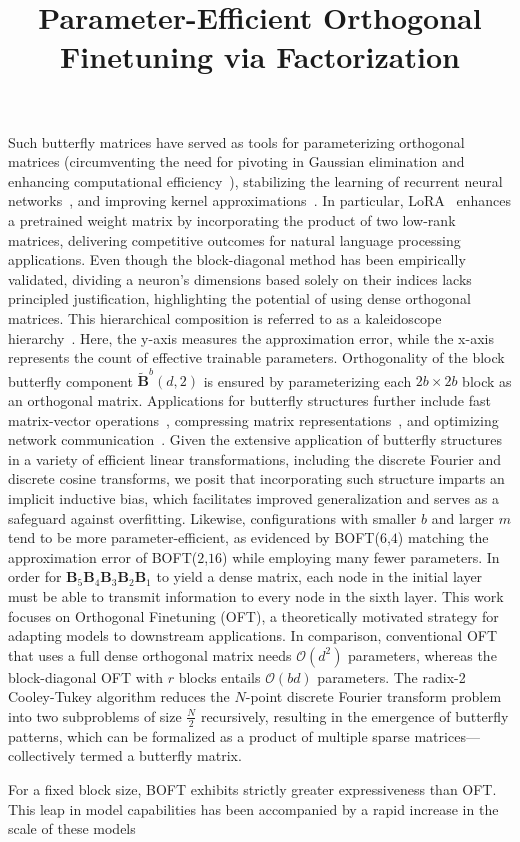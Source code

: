 \title{Parameter-Efficient Orthogonal Finetuning via Factorization}
Such butterfly matrices have served as tools for parameterizing orthogonal matrices (circumventing the need for pivoting in Gaussian elimination and enhancing computational efficiency~\cite{parker1995random}), stabilizing the learning of recurrent neural networks~\cite{jing2017tunable}, and improving kernel approximations~\cite{munkhoeva2018quadrature}. In particular, LoRA~\cite{hulora2022} enhances a pretrained weight matrix by incorporating the product of two low-rank matrices, delivering competitive outcomes for natural language processing applications. Even though the block-diagonal method has been empirically validated, dividing a neuron’s dimensions based solely on their indices lacks principled justification, highlighting the potential of using dense orthogonal matrices. This hierarchical composition is referred to as a kaleidoscope hierarchy~\cite{dao2019kaleidoscope}. Here, the y-axis measures the approximation error, while the x-axis represents the count of effective trainable parameters. Orthogonality of the block butterfly component $\tilde{\bm{B}}^b(d,2)$ is ensured by parameterizing each $2b\times 2b$ block as an orthogonal matrix. Applications for butterfly structures further include fast matrix-vector operations~\cite{michielssen1996multilevel,o2010algorithm}, compressing matrix representations~\cite{li2015butterfly}, and optimizing network communication~\cite{klasing1994broadcasting,li2003linear,rajasingh2016transmission}. Given the extensive application of butterfly structures in a variety of efficient linear transformations, including the discrete Fourier and discrete cosine transforms, we posit that incorporating such structure imparts an implicit inductive bias, which facilitates improved generalization and serves as a safeguard against overfitting. Likewise, configurations with smaller $b$ and larger $m$ tend to be more parameter-efficient, as evidenced by BOFT($6$,$4$) matching the approximation error of BOFT($2$,$16$) while employing many fewer parameters. In order for $\bm{B}_5\bm{B}_4\bm{B}_3\bm{B}_2\bm{B}_1$ to yield a dense matrix, each node in the initial layer must be able to transmit information to every node in the sixth layer. This work focuses on Orthogonal Finetuning (OFT), a theoretically motivated strategy for adapting models to downstream applications. In comparison, conventional OFT that uses a full dense orthogonal matrix needs $\mathcal{O}(d^2)$ parameters, whereas the block-diagonal OFT with $r$ blocks entails $\mathcal{O}(bd)$ parameters. The radix-2 Cooley-Tukey algorithm reduces the $N$-point discrete Fourier transform problem into two subproblems of size $\frac{N}{2}$ recursively, resulting in the emergence of butterfly patterns, which can be formalized as a product of multiple sparse matrices—collectively termed a butterfly matrix. \begin{theorem}\label{thm:exp_boft}
    For a fixed block size, BOFT exhibits strictly greater expressiveness than OFT. This leap in model capabilities has been accompanied by a rapid increase in the scale of these models


\end{theorem}
